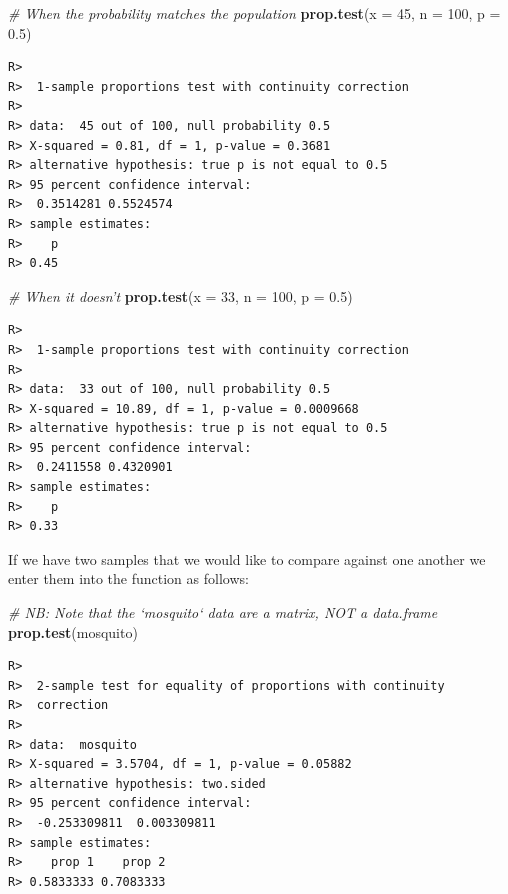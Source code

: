 \documentclass[english,10pt,a4paper,oneside]{book}
\newenvironment{Shaded}{\begin{snugshade}}{\end{snugshade}}
\newcommand{\KeywordTok}[1]{\textcolor[rgb]{0.13,0.29,0.53}{\textbf{#1}}}
\newcommand{\DataTypeTok}[1]{\textcolor[rgb]{0.13,0.29,0.53}{#1}}
\newcommand{\DecValTok}[1]{\textcolor[rgb]{0.00,0.00,0.81}{#1}}
\newcommand{\FloatTok}[1]{\textcolor[rgb]{0.00,0.00,0.81}{#1}}
\newcommand{\CommentTok}[1]{\textcolor[rgb]{0.56,0.35,0.01}{\textit{#1}}}
\newcommand{\NormalTok}[1]{#1}
\theoremstyle{definition}
\theoremstyle{definition}
\theoremstyle{definition}
\theoremstyle{remark}
\begin{document}
\begin{Shaded}
\begin{Highlighting}[]
\CommentTok{# When the probability matches the population}
\KeywordTok{prop.test}\NormalTok{(}\DataTypeTok{x =} \DecValTok{45}\NormalTok{, }\DataTypeTok{n =} \DecValTok{100}\NormalTok{, }\DataTypeTok{p =} \FloatTok{0.5}\NormalTok{)}
\end{Highlighting}
\end{Shaded}

\begin{verbatim}
R> 
R>  1-sample proportions test with continuity correction
R> 
R> data:  45 out of 100, null probability 0.5
R> X-squared = 0.81, df = 1, p-value = 0.3681
R> alternative hypothesis: true p is not equal to 0.5
R> 95 percent confidence interval:
R>  0.3514281 0.5524574
R> sample estimates:
R>    p 
R> 0.45
\end{verbatim}

\begin{Shaded}
\begin{Highlighting}[]
\CommentTok{# When it doesn't}
\KeywordTok{prop.test}\NormalTok{(}\DataTypeTok{x =} \DecValTok{33}\NormalTok{, }\DataTypeTok{n =} \DecValTok{100}\NormalTok{, }\DataTypeTok{p =} \FloatTok{0.5}\NormalTok{)}
\end{Highlighting}
\end{Shaded}

\begin{verbatim}
R> 
R>  1-sample proportions test with continuity correction
R> 
R> data:  33 out of 100, null probability 0.5
R> X-squared = 10.89, df = 1, p-value = 0.0009668
R> alternative hypothesis: true p is not equal to 0.5
R> 95 percent confidence interval:
R>  0.2411558 0.4320901
R> sample estimates:
R>    p 
R> 0.33
\end{verbatim}

If we have two samples that we would like to compare against one another
we enter them into the function as follows:

\begin{Shaded}
\begin{Highlighting}[]
\CommentTok{# NB: Note that the `mosquito` data are a matrix, NOT a data.frame}
\KeywordTok{prop.test}\NormalTok{(mosquito)}
\end{Highlighting}
\end{Shaded}

\begin{verbatim}
R> 
R>  2-sample test for equality of proportions with continuity
R>  correction
R> 
R> data:  mosquito
R> X-squared = 3.5704, df = 1, p-value = 0.05882
R> alternative hypothesis: two.sided
R> 95 percent confidence interval:
R>  -0.253309811  0.003309811
R> sample estimates:
R>    prop 1    prop 2 
R> 0.5833333 0.7083333
\end{verbatim}
\end{document}
